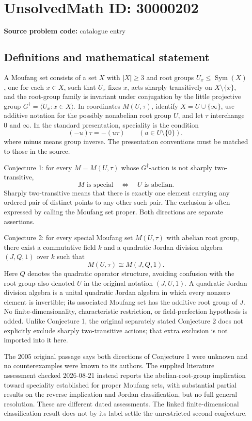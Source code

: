 \documentclass[11pt]{article}
\begin{document}
\section*{UnsolvedMath ID: 30000202}
\textbf{Source problem code:} catalogue entry
\subsection{Definitions and mathematical statement}
A Moufang set consists of a set \(X\) with \(|X|\geq3\) and root groups \(U_x\leq\operatorname{Sym}(X)\), one for each \(x\in X\), such that \(U_x\) fixes \(x\), acts sharply transitively on \(X\setminus\{x\}\), and the root-group family is invariant under conjugation by the little projective group \(G^\dagger=\langle U_x:x\in X\rangle\). In coordinates \(M(U,\tau)\), identify \(X=U\cup\{\infty\}\), use additive notation for the possibly nonabelian root group \(U\), and let \(\tau\) interchange \(0\) and \(\infty\). In the standard presentation, speciality is the condition
\[
(-u)\tau=-(u\tau)\qquad(u\in U\setminus\{0\}),
\]
where minus means group inverse. The presentation conventions must be matched to those in the source.

Conjecture 1: for every \(M=M(U,\tau)\) whose \(G^\dagger\)-action is not sharply two-transitive,
\[
M\text{ is special}\quad\Longleftrightarrow\quad U\text{ is abelian}.
\]
Sharply two-transitive means that there is exactly one element carrying any ordered pair of distinct points to any other such pair. The exclusion is often expressed by calling the Moufang set proper. Both directions are separate assertions.

Conjecture 2: for every special Moufang set \(M(U,\tau)\) with abelian root group, there exist a commutative field \(k\) and a quadratic Jordan division algebra \((J,Q,1)\) over \(k\) such that
\[
M(U,\tau)\cong M(J,Q,1).
\]
Here \(Q\) denotes the quadratic operator structure, avoiding confusion with the root group also denoted \(U\) in the original notation \((J,U,1)\). A quadratic Jordan division algebra is a unital quadratic Jordan algebra in which every nonzero element is invertible; its associated Moufang set has the additive root group of \(J\). No finite-dimensionality, characteristic restriction, or field-perfection hypothesis is added. Unlike Conjecture 1, the original separately stated Conjecture 2 does not explicitly exclude sharply two-transitive actions; that extra exclusion is not imported into it here.

The 2005 original passage says both directions of Conjecture 1 were unknown and no counterexamples were known to its authors. The supplied literature assessment checked 2026-08-21 instead reports the abelian-root-group implication toward speciality established for proper Moufang sets, with substantial partial results on the reverse implication and Jordan classification, but no full general resolution. These are different dated assessments. The linked finite-dimensional classification result does not by its label settle the unrestricted second conjecture.
\end{document}
